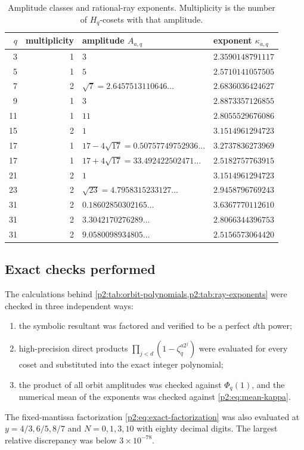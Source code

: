 \documentclass[11pt,oneside]{article}
\theoremstyle{definition}
\theoremstyle{remark}
\begin{document}
\begin{table}[ht]
\centering\footnotesize
\begin{tabularx}{\textwidth}{@{}r r X X@{}}
\toprule
$q$ & multiplicity & amplitude $A_{a,q}$ & exponent $\kappa_{a,q}$ \\
\midrule
3  & 1 & $3$ & $2.3590148791117$ \\
5  & 1 & $5$ & $2.5710141057505$ \\
7  & 2 & $\sqrt7=2.6457513110646\ldots$ & $2.6836036424627$ \\
9  & 1 & $3$ & $2.8873357126855$ \\
11 & 1 & $11$ & $2.8055529676086$ \\
15 & 2 & $1$ & $3.1514961294723$ \\
17 & 1 & $17-4\sqrt{17}=0.50757749752936\ldots$ & $3.2737836273969$ \\
17 & 1 & $17+4\sqrt{17}=33.492422502471\ldots$ & $2.5182757763915$ \\
21 & 2 & $1$ & $3.1514961294723$ \\
23 & 2 & $\sqrt{23}=4.7958315233127\ldots$ & $2.9458796769243$ \\
31 & 2 & $0.18602850302165\ldots$ & $3.6367770112610$ \\
31 & 2 & $3.3042170276289\ldots$ & $2.8066344396753$ \\
31 & 2 & $9.0580098934805\ldots$ & $2.5156573064420$ \\
\bottomrule
\end{tabularx}
\caption{Amplitude classes and rational-ray exponents. Multiplicity is the number
of $H_q$-cosets with that amplitude.}
\label{p2:tab:ray-exponents}
\end{table}

\subsection{Exact checks performed}

The calculations behind \cref{p2:tab:orbit-polynomials,p2:tab:ray-exponents} were checked
in three independent ways:
\begin{enumerate}
 \item the symbolic resultant was factored and verified to be a perfect $d$th
 power;
 \item high-precision direct products $\prod_{j<d}(1-\zeta_q^{a2^j})$ were evaluated
 for every coset and substituted into the exact integer polynomial;
 \item the product of all orbit amplitudes was checked against $\Phi_q(1)$, and the
 numerical mean of the exponents was checked against \eqref{p2:eq:mean-kappa}.
\end{enumerate}
The fixed-mantissa factorization \eqref{p2:eq:exact-factorization} was also evaluated
at $y=4/3,6/5,8/7$ and $N=0,1,3,10$ with eighty decimal digits. The largest relative
discrepancy was below $3\times10^{-78}$.
\end{document}
